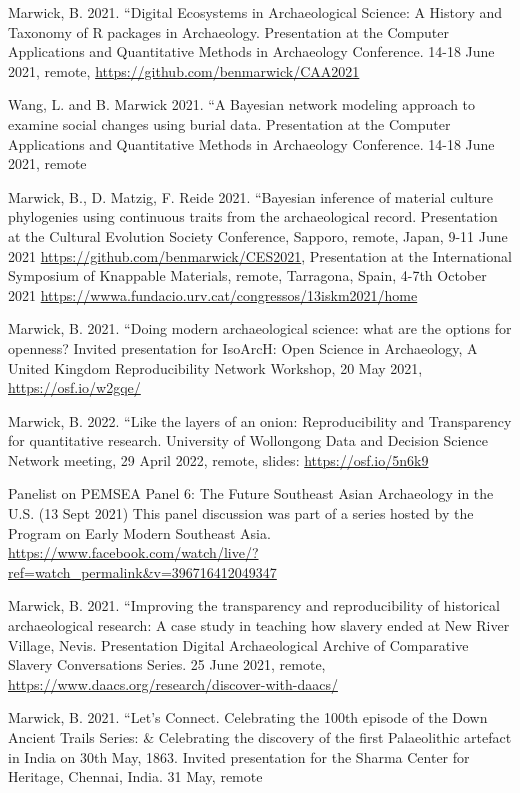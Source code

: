 \ind Marwick, B. 2021. ``Digital Ecosystems in Archaeological Science: A History and Taxonomy of R packages in Archaeology. Presentation at the Computer Applications and Quantitative Methods in Archaeology Conference. 14-18 June 2021, remote,  \url{https://github.com/benmarwick/CAA2021}  

\ind Wang, L. and B. Marwick 2021. ``A Bayesian network modeling approach to examine social changes using burial data. Presentation at the Computer Applications and Quantitative Methods in Archaeology Conference. 14-18 June 2021, remote 

\ind Marwick, B., D. Matzig, F. Reide 2021. ``Bayesian inference of material culture phylogenies using continuous traits from the archaeological record.  Presentation at the Cultural Evolution Society Conference, Sapporo, remote, Japan, 9-11 June 2021  \url{https://github.com/benmarwick/CES2021}, Presentation at the International Symposium of Knappable Materials, remote, Tarragona, Spain, 4-7th October 2021  \url{https://wwwa.fundacio.urv.cat/congressos/13iskm2021/home}  

\ind Marwick, B. 2021. ``Doing modern archaeological science: what are the options for openness? Invited presentation for IsoArcH: Open Science in Archaeology, A United Kingdom Reproducibility Network Workshop, 20 May 2021,  \url{https://osf.io/w2gqe/}  

\ind Marwick, B. 2022. ``Like the layers of an onion: Reproducibility and Transparency for quantitative research. University of Wollongong Data and Decision Science Network meeting, 29 April 2022, remote, slides:  \url{https://osf.io/5n6k9}  

\ind Panelist on PEMSEA Panel 6: The Future Southeast Asian Archaeology in the U.S. (13 Sept 2021) This panel discussion was part of a series hosted by the Program on Early Modern Southeast Asia.  \url{https://www.facebook.com/watch/live/?ref=watch_permalink&v=396716412049347}   

\ind Marwick, B. 2021. ``Improving the transparency and reproducibility of historical archaeological research: A case study in teaching how slavery ended at New River Village, Nevis. Presentation Digital Archaeological Archive of Comparative Slavery Conversations Series. 25 June 2021, remote,  \url{https://www.daacs.org/research/discover-with-daacs/}  

\ind Marwick, B. 2021. ``Let's Connect. Celebrating the 100th episode of the Down Ancient Trails Series: \& Celebrating the discovery of the first Palaeolithic artefact in India on 30th May, 1863. Invited presentation for the Sharma Center for Heritage, Chennai, India. 31 May, remote 


